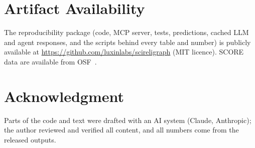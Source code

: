 \documentclass[conference]{IEEEtran}
\begin{document}
\section*{Artifact Availability}
The reproducibility package (code, MCP server, tests, predictions, cached LLM and agent responses, and the scripts behind every table and number) is publicly available at \url{https://github.com/luxinlabs/scireligraph} (MIT licence). SCORE data are available from OSF~\cite{score_g5sny}.

\section*{Acknowledgment}
Parts of the code and text were drafted with an AI system (Claude, Anthropic); the author reviewed and verified all content, and all numbers come from the released outputs.



\end{document}
